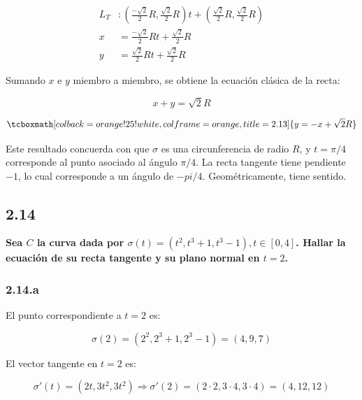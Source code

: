 \documentclass{article}
\begin{document}
\begin{subequations}
\begin{align}
L_T &: \left( \frac{-\sqrt{2}}{2} R, \frac{\sqrt{2}}{2} R \right) t + \left( \frac{\sqrt{2}}{2} R, \frac{\sqrt{2}}{2} R \right) \\
x &= \frac{-\sqrt{2}}{2} R t + \frac{\sqrt{2}}{2} R \\
y &= \frac{\sqrt{2}}{2} R t + \frac{\sqrt{2}}{2} R
\end{align}
\end{subequations}

Sumando $x$ e $y$ miembro a miembro, se obtiene la ecuación clásica de la recta:

\begin{equation}
x + y = \sqrt{2} R
\end{equation}

\begin{equation}
\tcboxmath[colback=orange!25!white,colframe=orange,title=2.13]
{
y = -x + \sqrt{2} R
}
\end{equation}

Este resultado concuerda con que $\sigma$ es una circunferencia de radio $R$, y $t = \pi/4$ corresponde al punto asociado al ángulo $\pi/4$. La recta tangente tiene pendiente $-1$, lo cual corresponde a un ángulo de $-pi/4$. Geométricamente, tiene sentido.

\subsection*{2.14}
\label{subsec:2.14}

\textbf{Sea $C$ la curva dada por $\sigma(t) = (t^2, t^3 + 1, t^3-1), t \in [0, 4]$. Hallar la ecuación de su recta tangente y su plano normal en $t = 2$.}

\subsubsection*{2.14.a}
\label{subsubsec:2.14.a}

El punto correspondiente a $t = 2$ es:

\begin{equation}
\sigma(2) = (2^2, 2^3+1, 2^3-1) = (4, 9, 7)
\end{equation}

El vector tangente en $t = 2$ es:

\begin{equation}
\sigma'(t) = (2t, 3t^2, 3t^2) \Rightarrow \sigma'(2) = (2 \cdot 2, 3 \cdot 4, 3 \cdot 4) = (4, 12, 12)
\end{equation}
\end{document}
